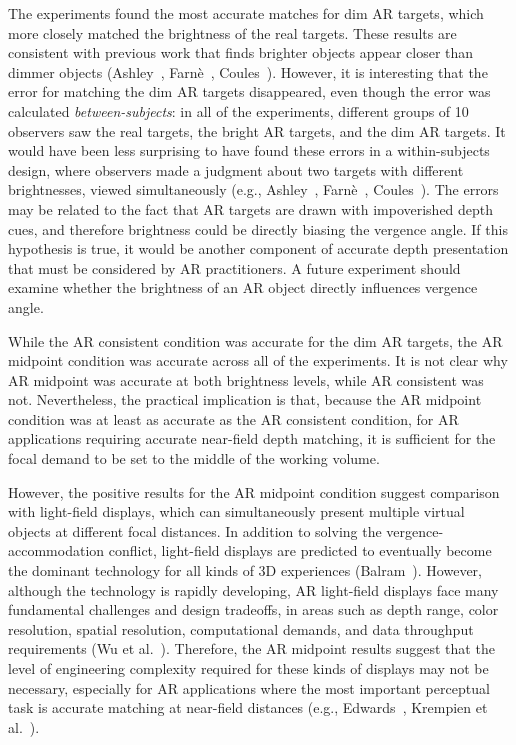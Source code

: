 \documentclass[10pt,journal,compsoc]{IEEEtran}
\makeatletter
\newcommand{\etal}{et al.\@\xspace} %
\newcommand{\ParLabel}[1]{\vspace{\topsep}\noindent{\sf\bfseries\small #1}}
\makeatother
\begin{document}
\ParLabel{Dim Targets:} The experiments found the most accurate matches for dim AR targets, which more closely matched the brightness of the real targets.  These results are consistent with previous work that finds brighter objects appear closer than dimmer objects (Ashley~\cite{ashley:1898}, Farn\`{e}~\cite{farne:1977}, Coules~\cite{coules:1955}).  However, it is interesting that the error for matching the dim AR targets disappeared, even though the error was calculated \emph{between-subjects}: in all of the experiments, different groups of 10 observers saw the real targets, the bright AR targets, and the dim AR targets.  It would have been less surprising to have found these errors in a within-subjects design, where observers made a judgment about two targets with different brightnesses, viewed simultaneously (e.g., Ashley~\cite{ashley:1898}, Farn\`{e}~\cite{farne:1977}, Coules~\cite{coules:1955}).  The errors may be related to the fact that AR targets are drawn with impoverished depth cues, and therefore brightness could be directly biasing the vergence angle.  If this hypothesis is true, it would be another component of accurate depth presentation that must be considered by AR practitioners.  A future experiment should examine whether the brightness of an AR object directly influences vergence angle. 

\ParLabel{Midpoint Accommodative Stimulus:} While the AR consistent condition was accurate for the dim AR targets, the AR midpoint condition was accurate across all of the experiments.  It is not clear why AR midpoint was accurate at both brightness levels, while AR consistent was not.  
Nevertheless, the practical implication is that, because the AR midpoint condition was at least as accurate as the AR consistent condition, for AR applications requiring accurate near-field depth matching, it is sufficient for the focal demand to be set to the middle of the working volume.  

However, the positive results for the AR midpoint condition suggest comparison with light-field displays, which can simultaneously present multiple virtual objects at different focal distances.  In addition to solving the vergence-accommodation conflict, light-field displays are predicted to eventually become the dominant technology for all kinds of 3D experiences (Balram~\cite{balram:2014}).  However, although the technology is rapidly developing, AR light-field displays face many fundamental challenges and design tradeoffs, in areas such as  depth range, color resolution, spatial resolution, computational demands, and data throughput requirements (Wu \etal~\cite{wu:2014}).  Therefore, the AR midpoint results suggest that the level of engineering complexity required for these kinds of displays may not be necessary, especially for AR applications where the most important perceptual task is accurate matching at near-field distances (e.g., Edwards~\cite{edwards:2000}, Krempien \etal~\cite{krempien:2008}). 
\end{document}
